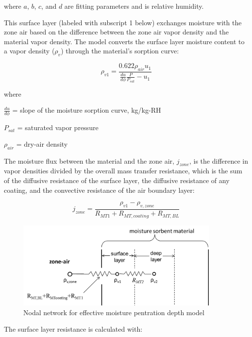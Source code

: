 where $a$, $b$, $c$, and $d$ are fitting parameters and \phi is relative humidity.

This surface layer (labeled with subscript 1 below) exchanges moisture with the zone air based on the difference between the zone air vapor density and the material vapor density. The model converts the surface layer moisture content to a vapor density ($\rho_v$) through the material's sorption curve:

\begin{equation}
\rho_{v1} = \frac {0.622 \rho_{air} u_{1}} {\frac{du}{d\phi} \frac{P}{P_{sat}} - u_{1}}
\end{equation}

where

$\frac{du}{d\phi}$ = slope of the moisture sorption curve, kg/kg-RH

$P_{sat}$ = saturated vapor pressure

$\rho_{air}$ = dry-air density

The moisture flux between the material and the zone air, $j_{zone}$, is the difference in vapor densities divided by the overall mass transfer resistance, which is the sum of the diffusive resistance of the surface layer, the diffusive resistance of any coating, and the convective resistance of the air boundary layer:

\begin{equation}
j_{zone} = \frac{\rho_{v1} - \rho_{v,zone}}{R_{MT1} + R_{MT,coating} + R_{MT,BL}}
\end{equation}

\begin{figure}[hbtp]
\centering
\includegraphics[width=0.9\textwidth, height=0.9\textheight, keepaspectratio=true]{media/EMPDschematic.png}
\caption{Nodal network for effective moisture pentration depth model \protect \label{fig:Nodal-network-for-effective-moisture-penetration-depth-model}}
\end{figure}

The surface layer resistance is calculated with:

